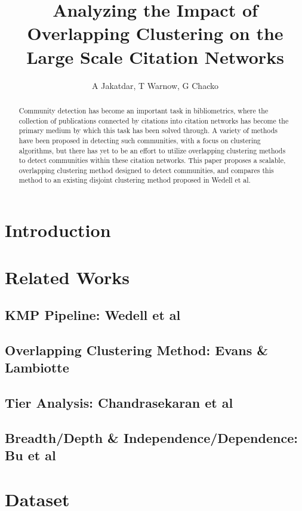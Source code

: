\documentclass{article}
\title{Analyzing the Impact of Overlapping Clustering on the Large Scale Citation Networks}
\author{A Jakatdar, T Warnow, G Chacko}
\begin{document}
\maketitle

\begin{abstract}
Community detection has become an important task in bibliometrics, where the collection of publications connected by citations into citation networks has become the primary medium by which this task has been solved through. A variety of methods have been proposed in detecting such communities, with a focus on clustering algorithms, but there has yet to be an effort to utilize overlapping clustering methods to detect communities within these citation networks. This paper proposes a scalable, overlapping clustering method designed to detect communities, and compares this method to an existing disjoint clustering method proposed in Wedell et al. 
\end{abstract}

\section{Introduction}
\section{Related Works}
\subsection{KMP Pipeline: Wedell et al}




\subsection{Overlapping Clustering Method: Evans \& Lambiotte}

\subsection{Tier Analysis: Chandrasekaran et al}

\subsection{Breadth/Depth \& Independence/Dependence: Bu et al}


\section{Dataset}
\end{document}
